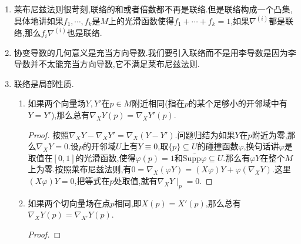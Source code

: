 \begin{enumerate}
	\item 莱布尼兹法则很苛刻,联络的和或者倍数都不再是联络.但是联络构成一个凸集,具体地讲如果$f_1,\cdots,f_k$是$M$上的光滑函数使得$f_1+\cdots+f_k=1$,如果$\nabla^{(i)}$都是联络,那么$f_i\nabla^{(i)}$也是联络.
	\item 协变导数的几何意义是充当方向导数.我们要引入联络而不是用李导数是因为李导数并不太能充当方向导数,它不满足莱布尼兹法则.
	\item 联络是局部性质.
	\begin{enumerate}
		\item 如果两个向量场$Y,Y'$在$p\in M$附近相同(指在$p$的某个足够小的开邻域中有$Y=Y'$),那么总有$\nabla_XY(p)=\nabla_XY'(p)$.
		\begin{proof}
			
			按照$\nabla_XY-\nabla_XY'=\nabla_X(Y-Y')$.问题归结为如果$Y$在$p$附近为零,那么$\nabla_XY=0$.设$p$的开邻域$U$上有$Y\equiv0$,取$\{p\}\subseteq U$的碰撞函数$\varphi$,换句话讲$\varphi$是取值在$[0,1]$的光滑函数,使得$\varphi(p)=1$和$\overline{\mathrm{Supp}\varphi}\subseteq U$.那么有$\varphi Y$在整个$M$上为零.按照莱布尼兹法则,有$0=\nabla_X(\varphi Y)=(X\varphi)Y+\varphi(\nabla_XY)$.这里$(X\varphi)Y=0$,把等式在$p$处取值,就有$\nabla_XY\mid_p=0$.
		\end{proof}
	    \item 如果两个切向量场在点$p$相同,即$X(p)=X'(p)$,那么总有$\nabla_XY(p)=\nabla_{X'}Y(p)$.
	    \begin{proof}
	    	

\end{proof}
\end{enumerate}
\end{enumerate}
